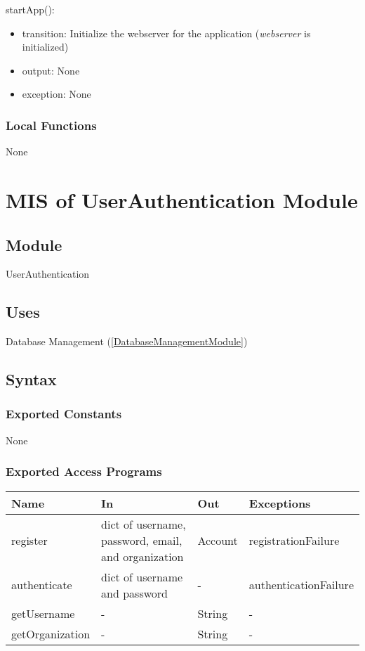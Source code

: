 \documentclass[12pt, titlepage]{article}
\begin{document}
\noindent startApp():
\begin{itemize}
\item transition: Initialize the webserver for the application (\textit{webserver} is initialized)
\item output: None
\item exception: None
\end{itemize}

\subsubsection{Local Functions}

None

\newpage


\section{MIS of UserAuthentication Module} \label{AuthenticationModule}

\subsection{Module}

UserAuthentication

\subsection{Uses}

Database Management (\ref{DatabaseManagementModule})

\subsection{Syntax}

\subsubsection{Exported Constants}

None


\subsubsection{Exported Access Programs}

\begin{center}
\begin{tabular}{p{4cm} p{4cm} p{2cm} p{4cm}}
\hline
\textbf{Name} & \textbf{In} & \textbf{Out} & \textbf{Exceptions} \\
\hline
register & dict of username, password, email, and organization & Account & registrationFailure \\
\hline
authenticate & dict of username and password & - & authenticationFailure \\
\hline
getUsername & - & String & - \\
\hline
getOrganization & - & String & - \\
\hline
\end{tabular}
\end{center}
\end{document}
